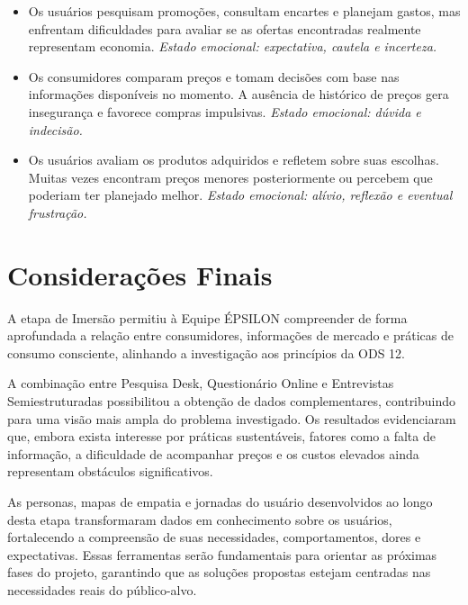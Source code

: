 \documentclass[12pt, a4paper]{article}
\newcommand{\novaSecao}[1]{\clearpage\vspace*{2.2cm}\section{#1}}
\begin{document}
\begin{itemize}[leftmargin=1.4em, itemsep=10pt]
  \item[\textcolor{wine}{\textbf{Antes}}] Os usuários pesquisam promoções, consultam encartes e planejam gastos, mas enfrentam dificuldades para avaliar se as ofertas encontradas realmente representam economia. \textit{Estado emocional: expectativa, cautela e incerteza.}

  \item[\textcolor{wine}{\textbf{Durante}}] Os consumidores comparam preços e tomam decisões com base nas informações disponíveis no momento. A ausência de histórico de preços gera insegurança e favorece compras impulsivas. \textit{Estado emocional: dúvida e indecisão.}

  \item[\textcolor{wine}{\textbf{Após}}] Os usuários avaliam os produtos adquiridos e refletem sobre suas escolhas. Muitas vezes encontram preços menores posteriormente ou percebem que poderiam ter planejado melhor. \textit{Estado emocional: alívio, reflexão e eventual frustração.}
\end{itemize}

\novaSecao{Considerações Finais}

A etapa de Imersão permitiu à Equipe ÉPSILON compreender de forma aprofundada a relação entre consumidores, informações de mercado e práticas de consumo consciente, alinhando a investigação aos princípios da ODS 12.

A combinação entre Pesquisa Desk, Questionário Online e Entrevistas Semiestruturadas possibilitou a obtenção de dados complementares, contribuindo para uma visão mais ampla do problema investigado. Os resultados evidenciaram que, embora exista interesse por práticas sustentáveis, fatores como a falta de informação, a dificuldade de acompanhar preços e os custos elevados ainda representam obstáculos significativos.

As personas, mapas de empatia e jornadas do usuário desenvolvidos ao longo desta etapa transformaram dados em conhecimento sobre os usuários, fortalecendo a compreensão de suas necessidades, comportamentos, dores e expectativas. Essas ferramentas serão fundamentais para orientar as próximas fases do projeto, garantindo que as soluções propostas estejam centradas nas necessidades reais do público-alvo.
\end{document}
